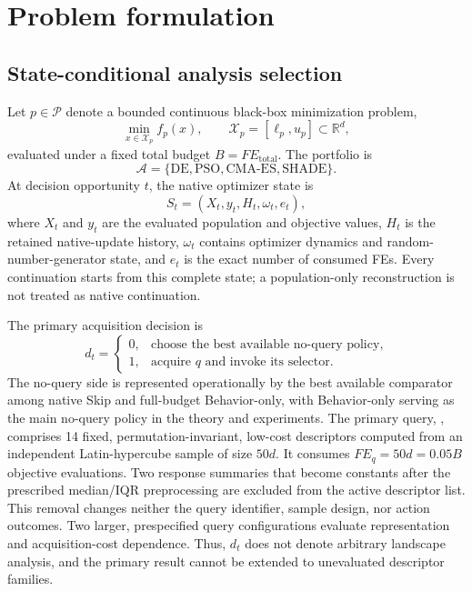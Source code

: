 \section{Problem formulation}
\label{sec:problem-formulation}

\subsection{State-conditional analysis selection}

Let $p\in\mathcal{P}$ denote a bounded continuous black-box minimization
problem,
\begin{equation}
  \min_{x\in\mathcal{X}_p} f_p(x),
  \qquad
  \mathcal{X}_p=[\ell_p,u_p]\subset\mathbb{R}^{d},
  \label{eq:black-box-problem}
\end{equation}
evaluated under a fixed total budget $B=FE_{\mathrm{total}}$.  The portfolio is
\begin{equation}
  \mathcal{A}=\{\mathrm{DE},\mathrm{PSO},\mathrm{CMA\mbox{-}ES},\mathrm{SHADE}\}.
\end{equation}
At decision opportunity $t$, the native optimizer state is
\begin{equation}
  S_t=(X_t,y_t,H_t,\omega_t,e_t),
  \label{eq:complete-search-state}
\end{equation}
where $X_t$ and $y_t$ are the evaluated population and objective values, $H_t$
is the retained native-update history, $\omega_t$ contains optimizer dynamics
and random-number-generator state, and $e_t$ is the exact number of consumed
FEs.  Every continuation starts from this complete state; a population-only
reconstruction is not treated as native continuation.

The primary acquisition decision is
\begin{equation}
  d_t=
  \begin{cases}
    0, & \text{choose the best available no-query policy},\\
    1, & \text{acquire }q\text{ and invoke its selector}.
  \end{cases}
  \label{eq:analysis-decision}
\end{equation}
The no-query side is represented operationally by the best available comparator among native Skip and full-budget Behavior-only, with Behavior-only serving as the main no-query policy in the theory and experiments.
The primary query, \query{}, comprises 14 fixed, permutation-invariant,
low-cost descriptors computed from an independent Latin-hypercube sample of
size $50d$.  It consumes $FE_q=50d=0.05B$ objective evaluations.  Two response
summaries that become constants after the prescribed median/IQR preprocessing
are excluded from the active descriptor list.  This removal changes neither
the query identifier, sample design, nor action outcomes.  Two larger,
prespecified query configurations evaluate representation and acquisition-cost
dependence.  Thus, $d_t$ does not denote arbitrary landscape analysis, and the
primary result cannot be extended to unevaluated descriptor families.

